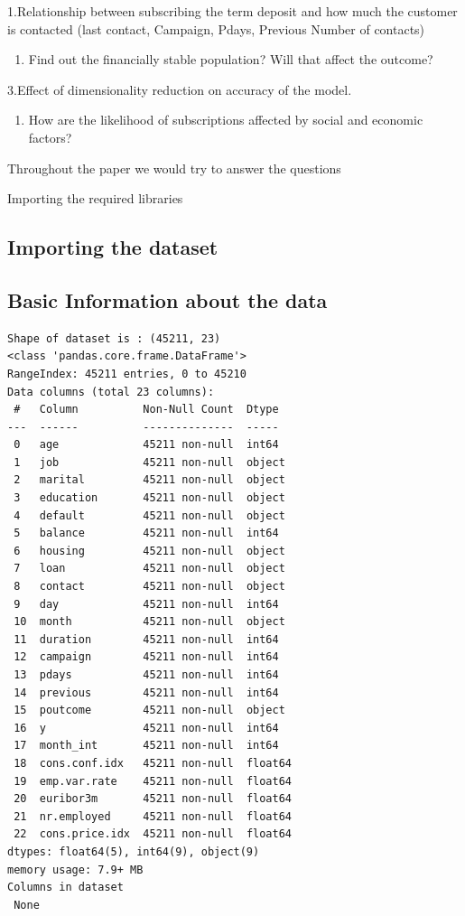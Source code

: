 \documentclass[
  letterpaper,
  DIV=11,
  numbers=noendperiod]{scrartcl}
\providecommand{\tightlist}{%
  \setlength{\itemsep}{0pt}\setlength{\parskip}{0pt}}\usepackage{longtable,booktabs,array}
\begin{document}
1.Relationship between subscribing the term deposit and how much the
customer is contacted (last contact, Campaign, Pdays, Previous Number of
contacts)

\begin{enumerate}
\def\labelenumi{\arabic{enumi}.}
\setcounter{enumi}{1}
\tightlist
\item
  Find out the financially stable population? Will that affect the
  outcome?
\end{enumerate}

3.Effect of dimensionality reduction on accuracy of the model.

\begin{enumerate}
\def\labelenumi{\arabic{enumi}.}
\setcounter{enumi}{3}
\tightlist
\item
  How are the likelihood of subscriptions affected by social and
  economic factors?
\end{enumerate}

Throughout the paper we would try to answer the questions

Importing the required libraries

\hypertarget{importing-the-dataset}{%
\subsection{Importing the dataset}\label{importing-the-dataset}}

\hypertarget{basic-information-about-the-data}{%
\subsection{Basic Information about the
data}\label{basic-information-about-the-data}}

\begin{verbatim}
Shape of dataset is : (45211, 23)
<class 'pandas.core.frame.DataFrame'>
RangeIndex: 45211 entries, 0 to 45210
Data columns (total 23 columns):
 #   Column          Non-Null Count  Dtype  
---  ------          --------------  -----  
 0   age             45211 non-null  int64  
 1   job             45211 non-null  object 
 2   marital         45211 non-null  object 
 3   education       45211 non-null  object 
 4   default         45211 non-null  object 
 5   balance         45211 non-null  int64  
 6   housing         45211 non-null  object 
 7   loan            45211 non-null  object 
 8   contact         45211 non-null  object 
 9   day             45211 non-null  int64  
 10  month           45211 non-null  object 
 11  duration        45211 non-null  int64  
 12  campaign        45211 non-null  int64  
 13  pdays           45211 non-null  int64  
 14  previous        45211 non-null  int64  
 15  poutcome        45211 non-null  object 
 16  y               45211 non-null  int64  
 17  month_int       45211 non-null  int64  
 18  cons.conf.idx   45211 non-null  float64
 19  emp.var.rate    45211 non-null  float64
 20  euribor3m       45211 non-null  float64
 21  nr.employed     45211 non-null  float64
 22  cons.price.idx  45211 non-null  float64
dtypes: float64(5), int64(9), object(9)
memory usage: 7.9+ MB
Columns in dataset 
 None
\end{verbatim}
\end{document}
